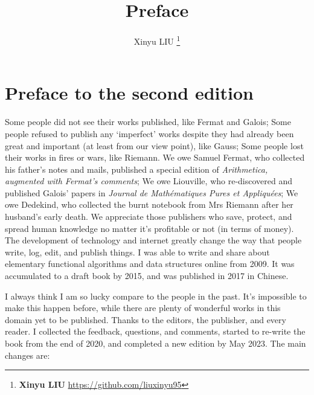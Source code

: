 \documentclass[b5paper]{article}
\begin{document}
\title{Preface}

\author{Xinyu LIU
\thanks{{\bfseries Xinyu LIU} \newline
  \url{https://github.com/liuxinyu95} \newline}
  }

\maketitle
\fi


\chapter*{Preface to the second edition}

Some people did not see their works published, like Fermat and Galois; Some people refused to publish any `imperfect' works despite they had already been great and important (at least from our view point), like Gauss; Some people lost their works in fires or wars, like Riemann. We owe Samuel Fermat, who collected his father's notes and mails, published a special edition of {\em Arithmetica, augmented with Fermat's comments}; We owe Liouville, who re-discovered and published Galois' papers in {\em Journal de Mathématiques Pures et Appliquées}; We owe Dedekind, who collected the burnt notebook from Mrs Riemann after her husband's early death. We appreciate those publishers who save, protect, and spread human knowledge no matter it's profitable or not (in terms of money). The development of technology and internet greatly change the way that people write, log, edit, and publish things. I was able to write and share about elementary functional algorithms and data structures online from 2009. It was accumulated to a draft book by 2015, and was published in 2017 in Chinese.

I always think I am so lucky compare to the people in the past. It's impossible to make this happen before, while there are plenty of wonderful works in this domain yet to be published. Thanks to the editors, the publisher, and every reader. I collected the feedback, questions, and comments, started to re-write the book from the end of 2020, and completed a new edition by May 2023. The main changes are:
\end{document}
